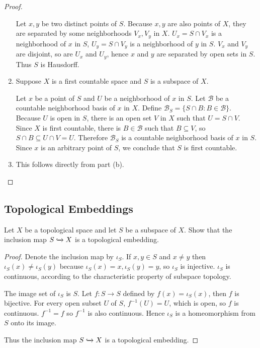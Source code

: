 \begin{proof}
\begin{enumerate}[label={(\alph*)}]
		      Let $x, y$ be two distinct points of $S$. Because $x, y$ are also points of $X$, they are separated by some neighborhoods $V_{x}, V_{y}$ in $X$. $U_{x} = S\cap V_{x}$ is a neighborhood of $x$ in $S$, $U_{y} = S\cap V_{y}$ is a neighborhood of $y$ in $S$. $V_{x}$ and $V_{y}$ are disjoint, so are $U_{x}$ and $U_{y}$, hence $x$ and $y$ are separated by open sets in $S$. Thus $S$ is Hausdorff.
		\item Suppose $X$ is a first countable space and $S$ is a subspace of $X$.

		      Let $x$ be a point of $S$ and $U$ be a neighborhood of $x$ in $S$. Let $\mathscr{B}$ be a countable neighborhood basis of $x$ in $X$. Define $\mathscr{B}_{S} = \{ S\cap B : B\in\mathscr{B} \}$. Because $U$ is open in $S$, there is an open set $V$ in $X$ such that $U = S\cap V$. Since $X$ is first countable, there is $B\in\mathscr{B}$ such that $B\subseteq V$, so $S\cap B\subseteq U\cap V = U$. Therefore $\mathscr{B}_{S}$ is a countable neighborhood basis of $x$ in $S$. Since $x$ is an arbitrary point of $S$, we conclude that $S$ is first countable.
		\item This follows directly from part (b).
	\end{enumerate}
\end{proof}

\subsection*{Topological Embeddings}

\begin{exercise}{3.13}
	Let $X$ be a topological space and let $S$ be a subspace of $X$. Show that the inclusion map $S\xhookrightarrow{} X$ is a topological embedding.
\end{exercise}

\begin{proof}
	Denote the inclusion map by $\iota_{S}$. If $x, y\in S$ and $x\ne y$ then $\iota_{S}(x)\ne \iota_{S}(y)$ because $\iota_{S}(x) = x, \iota_{S}(y) = y$, so $\iota_{S}$ is injective. $\iota_{S}$ is continuous, according to the characteristic property of subspace topology.

	The image set of $\iota_{S}$ is $S$. Let $f: S\to S$ defined by $f(x) = \iota_{S}(x)$, then $f$ is bijective. For every open subset $U$ of $S$, $f^{-1}(U) = U$, which is open, so $f$ is continuous. $f^{-1} = f$ so $f^{-1}$ is also continuous. Hence $\iota_{S}$ is a homeomorphism from $S$ onto its image.

	Thus the inclusion map $S\xhookrightarrow{} X$ is a topological embedding.
\end{proof}


